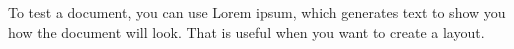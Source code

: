 \documentclass{minimal}
\begin{document}
	
	
	To test a document, you can use Lorem ipsum, which generates text to show you how the document will look.
	That is useful when you want to create a layout.
	
	
	\lipsum[1-10]
	
	
\end{document}
